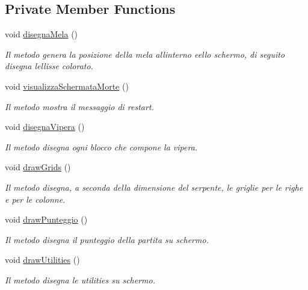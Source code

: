 \subsection*{Private Member Functions}
\begin{DoxyCompactItemize}
\item 
void \mbox{\hyperlink{class_snake_1_1gui_1_1_manager_g_u_i_a438db0a39d5c05d1dc557b2927726ef7}{disegna\+Mela}} ()
\begin{DoxyCompactList}\small\item\em Il metodo genera la posizione della mela all\textquotesingle{}interno eello schermo, di seguito disegna l\textquotesingle{}ellisse colorato. \end{DoxyCompactList}\item 
void \mbox{\hyperlink{class_snake_1_1gui_1_1_manager_g_u_i_a8e244c775b546a6e7d89884af1495892}{visualizza\+Schermata\+Morte}} ()
\begin{DoxyCompactList}\small\item\em Il metodo mostra il messaggio di restart. \end{DoxyCompactList}\item 
void \mbox{\hyperlink{class_snake_1_1gui_1_1_manager_g_u_i_a0e0d67c4f526a64346a8b90e7c9d673d}{disegna\+Vipera}} ()
\begin{DoxyCompactList}\small\item\em Il metodo disegna ogni blocco che compone la vipera. \end{DoxyCompactList}\item 
void \mbox{\hyperlink{class_snake_1_1gui_1_1_manager_g_u_i_a61024a21b8516cb0751fcecaf18c001d}{draw\+Grids}} ()
\begin{DoxyCompactList}\small\item\em Il metodo disegna, a seconda della dimensione del serpente, le griglie per le righe e per le colonne. \end{DoxyCompactList}\item 
void \mbox{\hyperlink{class_snake_1_1gui_1_1_manager_g_u_i_ab1a7af3f7073e8975696c4806e9194ef}{draw\+Punteggio}} ()
\begin{DoxyCompactList}\small\item\em Il metodo disegna il punteggio della partita su schermo. \end{DoxyCompactList}\item 
void \mbox{\hyperlink{class_snake_1_1gui_1_1_manager_g_u_i_ab4847130cdcf549a9cb479df18417787}{draw\+Utilities}} ()
\begin{DoxyCompactList}\small\item\em Il metodo disegna le utilities su schermo. \end{DoxyCompactList}\end{DoxyCompactItemize}
